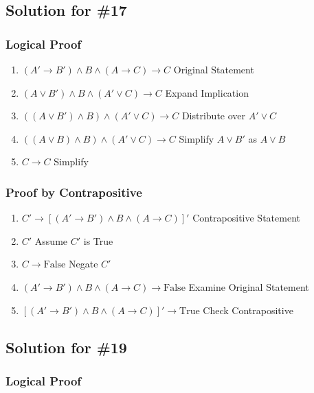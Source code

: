 \documentclass[12pt]{article}
\begin{document}
\newpage
\subsection*{Solution for \#17}

\subsubsection*{Logical Proof}

\begin{enumerate}
    \item \( (A' \to B') \land B \land (A \to C) \to C \) \hfill Original Statement
    \item \( (A \lor B') \land B \land (A' \lor C) \to C \) \hfill Expand Implication
    \item \( ((A \lor B') \land B) \land (A' \lor C) \to C \) \hfill Distribute over \( A' \lor C \)
    \item \( ((A \lor B) \land B) \land (A' \lor C) \to C \) \hfill Simplify \( A \lor B' \) as \( A \lor B \)
    \item \( C \to C \) \hfill Simplify
\end{enumerate}

\subsubsection*{Proof by Contrapositive}

\begin{enumerate}
    \item \( C' \to [(A' \to B') \land B \land (A \to C)]' \) \hfill Contrapositive Statement
    \item \( C' \) \hfill Assume \( C' \) is True
    \item \( C \to \text{False} \) \hfill Negate \( C' \)
    \item \( (A' \to B') \land B \land (A \to C) \to \text{False} \) \hfill Examine Original Statement
    \item \( [(A' \to B') \land B \land (A \to C)]' \to \text{True} \) \hfill Check Contrapositive
\end{enumerate}

\newpage
\subsection*{Solution for \#19}

\subsubsection*{Logical Proof}
\end{document}
